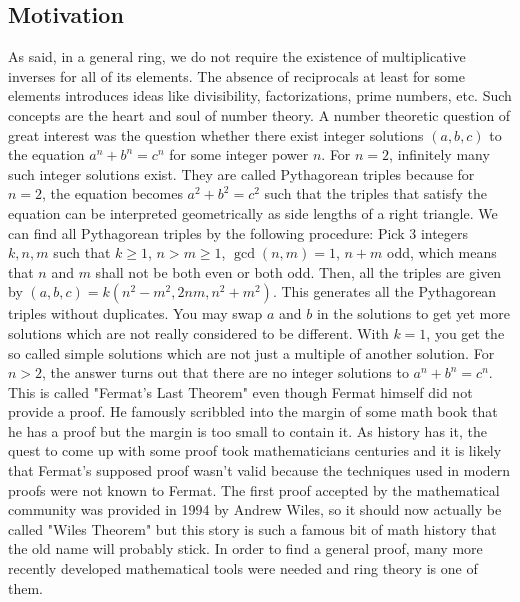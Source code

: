 \subsection{Motivation}
As said, in a general ring, we do not require the existence of multiplicative inverses for all of its elements. The absence of reciprocals at least for some elements introduces ideas like divisibility, factorizations, prime numbers, etc. Such concepts are the heart and soul of number theory. A number theoretic question of great interest was the question whether there exist integer solutions $(a,b,c)$ to the equation $a^n + b^n = c^n$ for some integer power $n$. For $n=2$, infinitely many such integer solutions exist. They are called Pythagorean triples because for $n=2$, the equation becomes $a^2 + b^2 = c^2$ such that the triples that satisfy the equation can be interpreted geometrically as side lengths of a right triangle. We can find all Pythagorean triples by the following procedure: Pick 3 integers $k,n,m$ such that $k \geq 1$, $n > m \geq 1$, $\gcd(n,m) = 1$, $n + m$ odd, which means that $n$ and $m$ shall not be both even or both odd. Then, all the triples are given by $(a,b,c) = k (n^2 - m^2, 2 n m, n^2 + m^2)$. This generates all the Pythagorean triples without duplicates. You may swap $a$ and $b$ in the solutions to get yet more solutions which are not really considered to be different. With $k=1$, you get the so called simple solutions which are not just a multiple of another solution. For $n > 2$, the answer turns out that there are no integer solutions to $a^n + b^n = c^n$. This is called "Fermat's Last Theorem" even though Fermat himself did not provide a proof. He famously scribbled into the margin of some math book that he has a proof but the margin is too small to contain it. As history has it, the quest to come up with some proof took mathematicians centuries and it is likely that Fermat's supposed proof wasn't valid because the techniques used in modern proofs were not known to Fermat. The first proof accepted by the mathematical community was provided in 1994 by Andrew Wiles, so it should now actually be called "Wiles Theorem" but this story is such a famous bit of math history that the old name will probably stick. In order to find a general proof, many more recently developed mathematical tools were needed and ring theory is one of them. 



